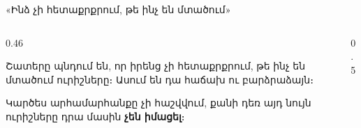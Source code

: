 
\begin{frame}{«Ինձ չի հետաքրքրում, թե ինչ են մտածում»}
  \begin{columns}[c]
    \begin{column}{0.46\textwidth}
      \begin{bookquote}
        Շատերը պնդում են, որ իրենց չի հետաքրքրում, թե ինչ են մտածում ուրիշները։ Ասում են դա հաճախ ու բարձրաձայն։\par\smallskip
        Կարծես արհամարհանքը չի հաշվվում, քանի դեռ այդ նույն ուրիշները դրա մասին \textbf{չեն իմացել}։
      \end{bookquote}
    \end{column}
    \begin{column}{0.5\textwidth}
      \centering
    \end{column}
  \end{columns}
\end{frame}

